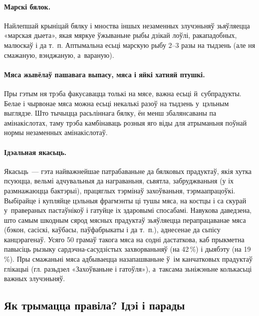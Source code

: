 \paragraph{Марскі бялок.}
Найлепшай крыніцай бялку і мноства іншых незаменных злучэньняў зьяўляецца «марская дыета», якая мяркуе ўжываньне рыбы дзікай лоўлі, ракападобных, малюскаў і да т.~п. Аптымальна есьці марскую рыбу 2--3 разы на тыдзень (але ня смажаную, вэнджаную, а~вараную).


\paragraph{Мяса жывёлаў пашавага выпасу, мяса і яйкі хатняй птушкі.}
Пры гэтым ня трэба факусавацца толькі на мясе, важна есьці й~субпрадукты. Белае і чырвонае мяса можна есьці некалькі разоў на тыдзень у~цэльным выглядзе. Што тычыцца расьліннага бялку, ён менш збалянсаваны па амінакіслотах, таму трэба камбінаваць розныя яго віды для атрыманьня поўнай нормы незаменных амінакіслотаў.

\paragraph{Ідэальная якасьць.}
Якасьць~--- гэта найважнейшае патрабаваньне да бялковых прадуктаў, якія хутка псуюцца, вельмі адчувальныя да награваньня, сьвятла, забруджваньня (у іх размнажаюцца бактэрыі), працяглых тэрмінаў захоўваньня, тэрмаапрацоўкі. Выбірайце і купляйце цэльныя фрагмэнты ці тушы мяса, на костцы і са скурай у~правераных пастаўнікоў і гатуйце іх здаровымі спосабамі. Навукова даведзена, што самым шкодным сярод мясных прадуктаў зьяўляецца перапрацаванае мяса (бэкон, сасіскі, каўбасы, паўфабрыкаты і да т.~п.), аднесенае да сьпісу канцэрагенаў. Усяго 50 грамаў такога мяса на содні дастаткова, каб прыкметна павысіць рызыку сардэчна-сасудзістых захворваньняў (на 42\,\%) і дыябэту (на 19\,\%). Пры смажаньні мяса адбываецца назапашваньне ў~ім канчатковых прадуктаў глікацыі (гл. разьдзел «Захоўваньне і гатоўля»), а~таксама зьніжэньне колькасьці важных злучэньняў.

\subsection{Як трымацца правіла? Ідэі і парады}

